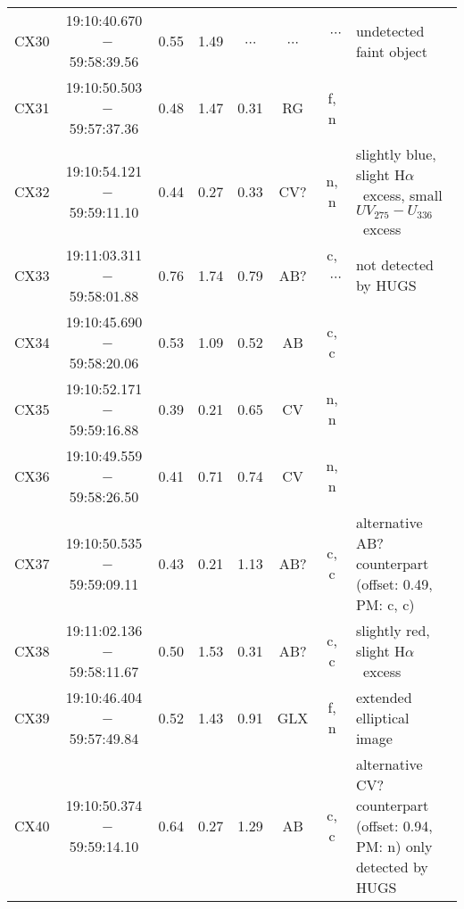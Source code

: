 \documentclass[fleqn,usenatbib]{mnras}
\newcommand{\ha}{\mbox{H$\alpha$}}
\newcommand{\UV}{\mbox{$UV_{275}$}}
\newcommand{\U}{\mbox{$U_{336}$}}
\newcommand{\uvu}{\mbox{$\UV\!-\!\U$}}
\newcommand\nodata{ ~$\cdots$~ }%
\newcommand{\nd}{\nodata}
\begin{document}
\begin{table*}
{{\begin{tabular}{lccccccp{108pt}}
CX30   &  19:10:40.670  ~$-$59:58:39.56  &  0.55  &  1.49  &  \nd        &  \nd       & \nd      &  undetected faint object \\
CX31   &  19:10:50.503  ~$-$59:57:37.36  &  0.48  &  1.47  &  0.31       &  RG        & f, n     &  \\
CX32   &  19:10:54.121  ~$-$59:59:11.10  &  0.44  &  0.27  &  0.33       &  CV?       & n, n     &  slightly blue, slight \ha\ excess, small \uvu\ excess \\
CX33   &  19:11:03.311  ~$-$59:58:01.88  &  0.76  &  1.74  &  0.79       &  AB?       & c, \nd   &  not detected by HUGS \\
CX34   &  19:10:45.690  ~$-$59:58:20.06  &  0.53  &  1.09  &  0.52       &  AB        & c, c     &  \\
CX35   &  19:10:52.171  ~$-$59:59:16.88  &  0.39  &  0.21  &  0.65       &  CV        & n, n     &  \\
CX36   &  19:10:49.559  ~$-$59:58:26.50  &  0.41  &  0.71  &  0.74       &  CV        & n, n     &  \\
CX37   &  19:10:50.535  ~$-$59:59:09.11  &  0.43  &  0.21  &  1.13       &  AB?       & c, c     &  alternative AB? counterpart (offset: 0.49, PM: c, c) \\
CX38   &  19:11:02.136  ~$-$59:58:11.67  &  0.50  &  1.53  &  0.31       &  AB?       & c, c     &  slightly red, slight \ha\ excess \\
CX39   &  19:10:46.404  ~$-$59:57:49.84  &  0.52  &  1.43  &  0.91       &  GLX       & f, n     &  extended elliptical image \\
CX40   &  19:10:50.374  ~$-$59:59:14.10  &  0.64  &  0.27  &  1.29       &  AB        & c, c     &  alternative CV? counterpart (offset: 0.94, PM: n) only detected by HUGS \\
\hline
\end{tabular}
}
}
\end{table*}
\end{document}
